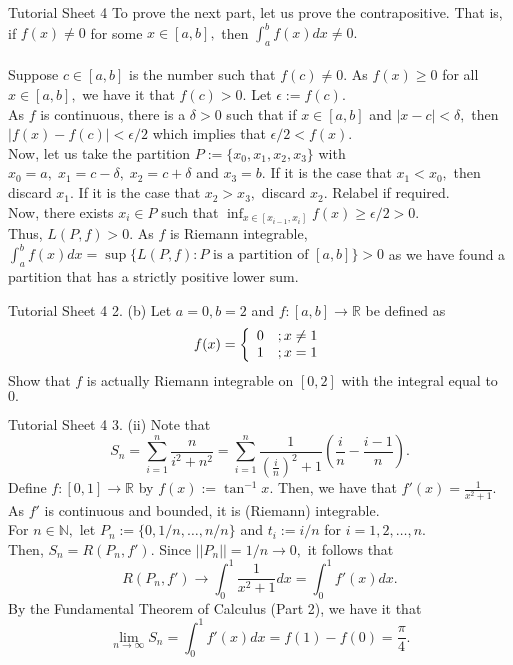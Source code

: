 \documentclass[aspectratio=169]{beamer}
\begin{document}
\begin{frame}{Tutorial Sheet 4}
	To prove the next part, let us prove the contrapositive. That is, if $f(x) \neq 0$ for some $x \in [a, b],$ then $\displaystyle\int_{a}^{b} f(x) dx \neq 0.$\\~\\
	Suppose $c \in [a, b]$ is the number such that $f(c) \neq 0.$ As $f(x) \ge 0$ for all $x \in [a, b],$ we have it that $f(c) > 0.$ Let $\epsilon := f(c).$\\
	As $f$ is continuous, there is a $\delta > 0$ such that if $x \in [a, b]$ and $|x - c| < \delta,$ then $|f(x) - f(c)| < \epsilon/2$ which implies that $\epsilon/2 < f(x).$\\
	Now, let us take the partition $P := \{x_0, x_1, x_2, x_3\}$ with $x_0 = a,\; x_1 = c-\delta,\;x_2 = c+\delta$ and $x_3 = b.$ If it is the case that $x_1 < x_0,$ then discard $x_1.$ If it is the case that $x_2 > x_3,$ discard $x_2.$ Relabel if required.\\
	Now, there exists $x_i \in P$ such that $\displaystyle\inf_{x \in [{x_{i-1}, x_i}]}f(x) \ge \epsilon/2 > 0.$\\
	Thus, $L(P, f) > 0.$ As $f$ is Riemann integrable, $\displaystyle\int_{a}^{b} f(x) dx = \sup\{L(P, f): P \text{ is a partition of } [a, b]\} > 0$ as we have found a partition that has a strictly positive lower sum.
\end{frame}

\begin{frame}{Tutorial Sheet 4}
	2. (b) Let $a = 0, b = 2$ and $f:[a, b] \to \mathbb{R}$ be defined as
	\[f(x) = \left\{\begin{array}[h]{c l}
		0 & ; x \neq 1 \\
		1 & ; x = 1
	\end{array}
	\right.\]
	Show that $f$ is actually Riemann integrable on $[0, 2]$ with the integral equal to $0.$
\end{frame}

\begin{frame}{Tutorial Sheet 4}
	3. (ii) Note that \\
	\[S_n = \sum_{i=1}^{n}\dfrac{n}{i^2 + n^2} = \sum_{i=1}^{n}\dfrac{1}{\left(\frac{i}{n}\right)^2 + 1}\left(\frac{i}{n} - \frac{i-1}{n}\right) .\]
	Define $f:[0, 1] \to \mathbb{R}$ by $f(x) := \tan^{-1}x.$ Then, we have that $f'(x) = \frac{1}{x^2 + 1}.$\\
	As $f'$ is continuous and bounded, it is (Riemann) integrable. \\
	For $n \in \mathbb{N},$ let $P_n := \{0, 1/n, \ldots, n/n\}$ and $t_i := i/n$ for $i = 1, 2, \ldots, n.$\\
	Then, $S_n = R(P_n, f').$ Since $||P_n|| = 1/n \to 0,$ it follows that
	\[R(P_n, f') \to \int_{0}^{1} \dfrac{1}{x^2 + 1} dx = \int_{0}^{1} f'(x) dx. \]
	By the Fundamental Theorem of Calculus (Part 2), we have it that
	\[\lim_{n\to \infty}S_n = \int_{0}^{1} f'(x) dx = f(1) - f(0) = \dfrac{\pi}{4}.\]
\end{frame}
\end{document}

